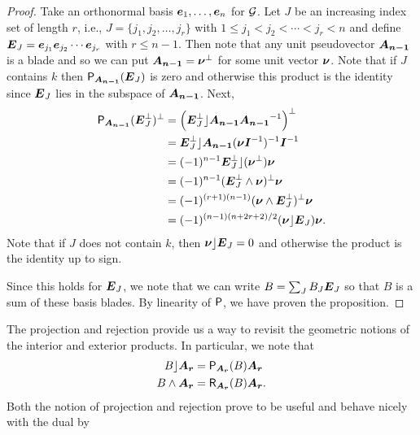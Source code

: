 \begin{proof}
Take an orthonormal basis $\boldsymbol{e}_1,\dots,\boldsymbol{e}_n$ for $\mathcal{G}$. Let $J$ be an increasing index set of length $r$, i.e., $J=\{j_1,j_2,\dots,j_r\}$ with $1\leq j_1 < j_2 <\cdots < j_r < n$ and define $\boldsymbol{E}_J = \boldsymbol{e}_{j_1}\boldsymbol{e}_{j_2}\cdots \boldsymbol{e}_{j_r}$ with $r\leq n-1$. Then note that any unit pseudovector $\boldsymbol{A_{n-1}}$ is a blade and so we can put $\boldsymbol{A_{n-1}} = \boldsymbol{\nu}^\perp$ for some unit vector $\boldsymbol{\nu}$.
Note that if $J$ contains $k$ then $\mathsf{P}_{\boldsymbol{A_{n-1}}}(\boldsymbol{E}_J)$ is zero and otherwise this product is the identity since $\boldsymbol{E}_J$ lies in the subspace of $\boldsymbol{A_{n-1}}$. Next,
\begin{align}
\mathsf{P}_{\boldsymbol{A_{n-1}}}(\boldsymbol{E}_J^\perp)^\perp &= \left( \boldsymbol{E}_J^\perp \rfloor \boldsymbol{A_{n-1}} \boldsymbol{A_{n-1}}^{-1}\right)^\perp\\
&= \boldsymbol{E}_J^\perp \rfloor \boldsymbol{A_{n-1}} (\boldsymbol{\nu} \boldsymbol{I}^{-1})^{-1} \boldsymbol{I}^{-1}\\
&= (-1)^{n-1} \boldsymbol{E}_J^\perp \rfloor (\boldsymbol{\nu}^\perp) \boldsymbol{\nu}\\
&= (-1)^{n-1} (\boldsymbol{E}_J^\perp \wedge \boldsymbol{\nu} )^\perp \boldsymbol{\nu}\\
&= (-1)^{(r+1)(n-1)}(\boldsymbol{\nu} \wedge \boldsymbol{E}_J^\perp)^\perp \boldsymbol{\nu}\\
&= (-1)^{(n-1)(n+2r+2)/2} (\boldsymbol{\nu} \rfloor \boldsymbol{E}_J) \boldsymbol{\nu}.
\end{align}
Note that if $J$ does not contain $k$, then $\boldsymbol{\nu} \rfloor \boldsymbol{E}_J=0$ and otherwise the product is the identity up to sign. 

Since this holds for $\boldsymbol{E}_J$, we note that we can write $B = \sum_J B_J \boldsymbol{E}_J$ so that $B$ is a sum of these basis blades. By linearity of $\mathsf{P}$, we have proven the proposition.
\end{proof}
The projection and rejection provide us a way to revisit the geometric notions of the interior and exterior products. In particular, we note that
\begin{align}
\label{eq:projection_inner_product}
    B \rfloor \boldsymbol{A_r} &= \mathsf{P}_{\boldsymbol{A_r}} (B) \boldsymbol{A_r}\\
    B \wedge \boldsymbol{A_r} &= \mathsf{R}_{\boldsymbol{A_r}}(B) \boldsymbol{A_r}.
\end{align}
Both the notion of projection and rejection prove to be useful and behave nicely with the dual by
